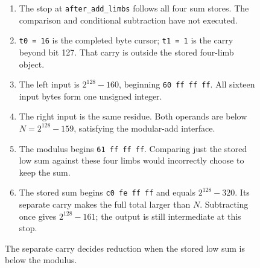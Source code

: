 \begin{figure}[htbp]
  \par\smallskip
  \begin{minipage}{\linewidth}
    \small
    \begin{enumerate}
      \setlength{\itemsep}{0pt}
            \setlength{\parsep}{0pt}
      \item The stop at \texttt{after\_add\_limbs} follows all four sum stores. The comparison and conditional subtraction have not executed.
      \item \texttt{t0 = 16} is the completed byte cursor; \texttt{t1 = 1} is the carry beyond bit 127. That carry is outside the stored four-limb object.
      \item The left input is $2^{128}-160$, beginning \texttt{60 ff ff ff}. All sixteen input bytes form one unsigned integer.
      \item The right input is the same residue. Both operands are below $N=2^{128}-159$, satisfying the modular-add interface.
      \item The modulus begins \texttt{61 ff ff ff}. Comparing just the stored low sum against these four limbs would incorrectly choose to keep the sum.
      \item The stored sum begins \texttt{c0 fe ff ff} and equals $2^{128}-320$. Its separate carry makes the full total larger than $N$. Subtracting once gives $2^{128}-161$; the output is still intermediate at this stop.
    \end{enumerate}
  \end{minipage}
  \caption{The separate carry decides reduction when the stored low sum is below the modulus.}
  \label{capture:027-rsa-arithmetic-f02}
  \label{rsa-f02}
\end{figure}
\par
